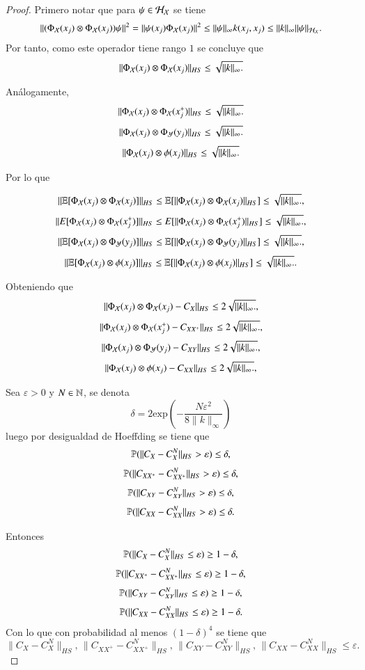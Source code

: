 \begin{proof}
        Primero notar que para $\psi \in \H_\X$ se tiene
    \[
    \| (\Phi_\X (x_j) \otimes \Phi_\X (x_j))\psi \|^2 = \| \psi(x_j) \Phi_\X (x_j) \|^2 \leq \| \psi \|_\infty k(x_j, x_j) \leq \| k \|_\infty \| \psi \|_{\H_\X}.
    \]
    Por tanto, como este operador tiene rango $1$ se concluye que
    \[ \| \Phi_\X (x_j) \otimes \Phi_\X (x_j) \|_{HS} \leq  \sqrt{\| k \|_\infty.} \] 

    Análogamente,
    \[
    \| \Phi_\X (x_j) \otimes \Phi_\X (x_j^+) \|_{HS} \leq \sqrt{\| k \|_\infty.}
    \]
     \[
    \| \Phi_\X (x_j) \otimes \Phi_\Y (y_j) \|_{HS} \leq \sqrt{\| k \|_\infty.}
    \]
     \[
    \| \Phi_\X (x_j) \otimes \phi (x_j) \|_{HS} \leq \sqrt{\| k \|_\infty.}
    \]

    Por lo que

    \[ \| \E[ \Phi_\X (x_j) \otimes \Phi_\X (x_j)] \|_{HS} \leq  \E[ \| \Phi_\X (x_j) \otimes \Phi_\X (x_j) \|_{HS} ] \leq \sqrt{\| k \|_\infty.}, \] 
    \[
    \| E[ \Phi_\X (x_j) \otimes \Phi_\X (x_j^+)] \|_{HS} \leq E[ \| \Phi_\X (x_j) \otimes \Phi_\X (x_j^+)\|_{HS}]  \leq \sqrt{\| k \|_\infty.},
    \]
     \[
    \| \E [\Phi_\X (x_j) \otimes \Phi_\Y (y_j)] \|_{HS} \leq \E [\| \Phi_\X (x_j) \otimes \Phi_\Y (y_j) \|_{HS}]  \leq \sqrt{\| k \|_\infty.},
    \]
     \[ \| \E[ \Phi_\X (x_j) \otimes \phi (x_j)] \|_{HS} \leq  \E[ \| \Phi_\X (x_j) \otimes \phi (x_j) \|_{HS} ] \leq \sqrt{\| k \|_\infty.}. \] 

     Obteniendo que
     \[
     \| \Phi_\X (x_j) \otimes \Phi_\X (x_j) - C_X \|_{HS} \leq 2 \sqrt{\| k \|_\infty.},
     \]
     \[
     \| \Phi_\X (x_j) \otimes \Phi_\X (x_j^+) - C_{XX^+} \|_{HS} \leq 2 \sqrt{\| k \|_\infty.},
     \]
     \[
     \| \Phi_\X (x_j) \otimes \Phi_\Y (y_j) - C_{XY} \|_{HS} \leq 2 \sqrt{\| k \|_\infty.},
     \]
    \[
     \| \Phi_\X (x_j) \otimes \phi (x_j) - C_{XX} \|_{HS} \leq 2 \sqrt{\| k \|_\infty.},
     \]

     Sea $\varepsilon > 0$ y $N \in \N$, se denota
     \[
     \delta = 2 \text{exp} \left ( - \frac{N \varepsilon^2}{8 \| k \|_\infty} \right )
     \]
     luego por desigualdad de Hoeffding se tiene que
    \[
    \P ( \| C_{X} - C_{X}^N \|_{HS} > \varepsilon ) \leq \delta,
    \]
    \[
    \P ( \| C_{XX^+} - C_{XX^+}^N \|_{HS} > \varepsilon ) \leq \delta,
    \]
    \[
    \P ( \| C_{XY} - C_{XY}^N \|_{HS} > \varepsilon ) \leq \delta,
    \]
    \[
    \P ( \| C_{XX} - C_{XX}^N \|_{HS} > \varepsilon ) \leq \delta.
    \]

    Entonces
    \[
    \P ( \| C_{X} - C_{X}^N \|_{HS} \leq \varepsilon ) \geq 1-\delta,
    \]
    \[
    \P ( \| C_{XX^+} - C_{XX^+}^N \|_{HS} \leq \varepsilon ) \geq 1-\delta,
    \]
    \[
    \P ( \| C_{XY} - C_{XY}^N \|_{HS} \leq \varepsilon ) \geq 1-\delta,
    \]
    \[
    \P ( \| C_{XX} - C_{XX}^N \|_{HS} \leq \varepsilon ) \geq 1-\delta.
    \]
    Con lo que con probabilidad al menos $(1-\delta)^4$ se tiene que
    \[
    \| C_{X} - C_{X}^N \|_{HS}, \, \| C_{XX^+} - C_{XX^+}^N \|_{HS}, \, \| C_{XY} - C_{XY}^N \|_{HS}, \, \| C_{XX} - C_{XX}^N \|_{HS} \leq \varepsilon.
    \]
\end{proof}

